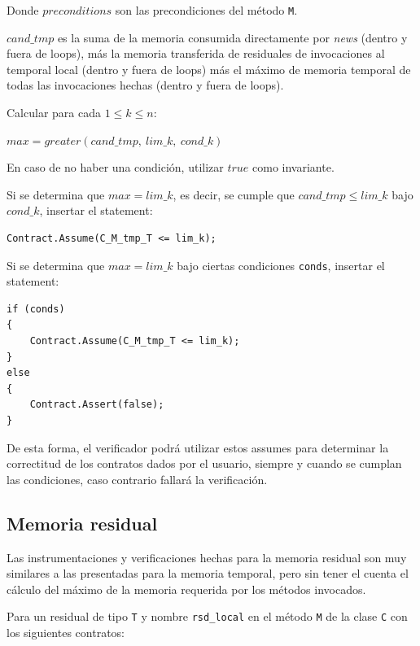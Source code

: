 \documentclass[12pt,a4paper]{article}
\newcommand\mono[1]{\texttt{#1}}
\begin{document}
				Donde $preconditions$ son las precondiciones del método \mono{M}.

				$cand\_tmp$ es la suma de la memoria consumida directamente por \textit{news} (dentro y fuera de loops), más la memoria transferida de residuales de invocaciones al temporal local (dentro y fuera de loops) más el máximo de memoria temporal de todas las invocaciones hechas (dentro y fuera de loops).

				Calcular para cada $1 \leq k \leq n$:

				\begin{center}
				$max = greater(cand\_tmp,\ lim\_k,\ cond\_k)$
				\end{center}

				En caso de no haber una condición, utilizar $true$ como invariante.

				Si se determina que $max = lim\_k$, es decir, se cumple que $cand\_tmp \leq lim\_k$ bajo $cond\_k$, insertar el statement:

				\vspace{5pt}
				\begin{lstlisting}[numbers=none]
Contract.Assume(C_M_tmp_T <= lim_k);
				\end{lstlisting}

				Si se determina que $max = lim\_k$ bajo ciertas condiciones \mono{conds}, insertar el statement:

				\vspace{5pt}
				\begin{lstlisting}[numbers=none]
if (conds)
{
	Contract.Assume(C_M_tmp_T <= lim_k);
}
else
{
	Contract.Assert(false);
}
				\end{lstlisting}

				De esta forma, el verificador podrá utilizar estos assumes para determinar la correctitud de los contratos dados por el usuario, siempre y cuando se cumplan las condiciones, caso contrario fallará la verificación.
		\subsection{Memoria residual}
			Las instrumentaciones y verificaciones hechas para la memoria residual son muy similares a las presentadas para la memoria temporal, pero sin tener el cuenta el cálculo del máximo de la memoria requerida por los métodos invocados.

			Para un residual de tipo \mono{T} y nombre \mono{rsd\_local} en el método \mono{M} de la clase \mono{C} con los siguientes contratos:
\end{document}
